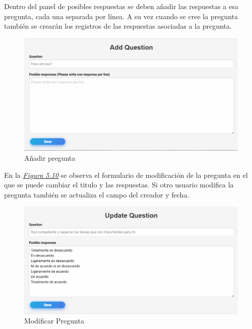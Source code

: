 Dentro del panel de posibles respuestas se deben añadir las respuestas a esa pregunta, cada una separada por línea. A su vez cuando se cree la pregunta también se crearán los registros de las respuestas asociadas a la pregunta. \vspace{1cm}

\begin{figure}[!ht]
    \centering
    \includegraphics[width=1\textwidth]{imagenes/add_question.png}
    \caption{ Añadir pregunta}
    \label{fig:add-question}
\end{figure}\vspace{1cm}


En la \textit{\hyperref[fig:modify-question]{Figura 5.10}} se observa el formulario de modificación de la pregunta en el que se puede cambiar el titulo y las respuestas. Si otro usuario modifica la pregunta también se actualiza el campo del creador y fecha.

\begin{figure}[!ht]
    \centering
    \includegraphics[width=1\textwidth]{imagenes/update_question.png}
    \caption{ Modificar Pregunta}
    \label{fig:modify-question}
\end{figure}\vspace{0.5cm}


